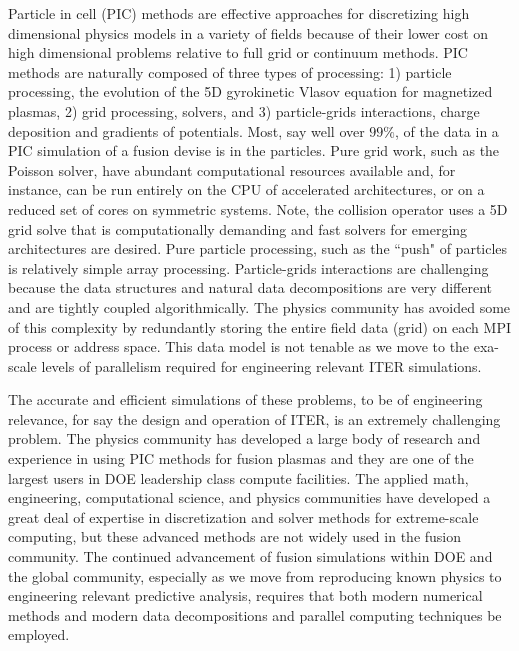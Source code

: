 \documentclass[review]{siamart}
\begin{document}
Particle in cell (PIC) methods are effective approaches for discretizing high dimensional physics models in a variety of fields because of their lower cost on high dimensional problems relative to full grid or continuum methods.
PIC methods are naturally composed of three types of processing: 1) particle processing, the evolution of the 5D gyrokinetic Vlasov equation for magnetized plasmas, 2) grid processing, solvers, and 3) particle-grids interactions, charge deposition and gradients of potentials.
Most, say well over $99\%$, of the data in a PIC simulation of a fusion devise is in the particles.
Pure grid work, such as the Poisson solver, have abundant computational resources available and, for instance, can be run entirely on the CPU of accelerated architectures, or on a reduced set of cores on symmetric systems.
Note, the collision operator uses a 5D grid solve that is computationally demanding and fast solvers for emerging architectures are desired.
Pure particle processing, such as the ``push" of particles is relatively simple array processing.
Particle-grids interactions are challenging because the data structures and natural data decompositions are very different and are tightly coupled algorithmically.
The physics community has avoided some of this complexity by redundantly storing the entire field data (grid) on each MPI process or address space.
This data model is not tenable as we move to the exa-scale levels of parallelism required for engineering relevant ITER simulations.

The accurate and efficient simulations of these problems, to be of engineering relevance, for say the design and operation of ITER, is an extremely challenging problem.
The physics community has developed a large body of research and experience in using PIC methods for fusion plasmas and they are one of the largest users in DOE leadership class compute facilities.
The applied math, engineering, computational science, and physics communities have developed a great deal of expertise in discretization and solver methods for extreme-scale computing, but these advanced methods are not widely used in the fusion community.
The continued advancement of fusion simulations within DOE and the global community, especially as we move from reproducing known physics to engineering relevant predictive analysis, requires that both modern numerical methods and modern data decompositions and parallel computing techniques be employed.
\end{document}
